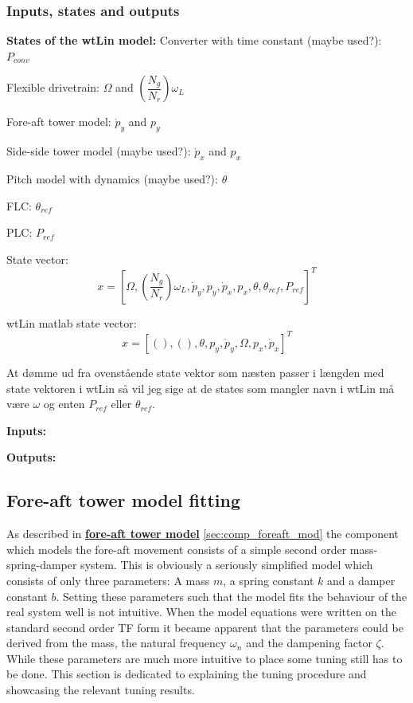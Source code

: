 \subsubsection{Inputs, states and outputs}
\textbf{States of the wtLin model:}
Converter with time constant (maybe used?): $ P_{conv} $

Flexible drivetrain: $ \Omega $ and $ \left( \dfrac{N_g}{N_r} \right)\omega_L $

Fore-aft tower model: $ \dot{p}_y $ and $ p_y $

Side-side tower model (maybe used?): $ \dot{p}_x $ and $ p_x $

Pitch model with dynamics (maybe used?): $ \theta $

FLC: $ \theta_{ref} $

PLC: $ P_{ref} $

State vector: 
\begin{equation}\label{key}
	x = [\Omega, \left( \dfrac{N_g}{N_r} \right)\omega_L, \dot{p}_y, p_y, \dot{p}_x, p_x, \theta, \theta_{ref}, P_{ref}]^T
\end{equation}

wtLin matlab state vector:
\begin{equation}\label{key}
	x = [(), (), \theta, p_y, \dot{p}_y, \Omega, p_x, \dot{p}_x]^T
\end{equation}

At dømme ud fra ovenstående state vektor som næsten passer i længden med state vektoren i wtLin så vil jeg sige at de states som mangler navn i wtLin må være $ \omega $ og enten $ P_{ref} $ eller $ \theta_{ref} $.

\textbf{Inputs:}


\textbf{Outputs:}

\subsection{Fore-aft tower model fitting} \label{sec:mod_foreaft_fitting}
As described in \hyperref[sec:comp_foreaft_mod]{\textbf{fore-aft tower model}} \cref{sec:comp_foreaft_mod} the component which models the fore-aft movement consists of a simple second order mass-spring-damper system. This is obviously a seriously simplified model which consists of only three parameters: A mass $ m $, a spring constant $ k $ and a damper constant $ b $. Setting these parameters such that the model fits the behaviour of the real system well is not intuitive. When the model equations were written on the standard second order TF form it became apparent that the parameters could be derived from the mass, the natural frequency $ \omega_n $ and the dampening factor $ \zeta $. While these parameters are much more intuitive to place some tuning still has to be done. This section is dedicated to explaining the tuning procedure and showcasing the relevant tuning results.\\


